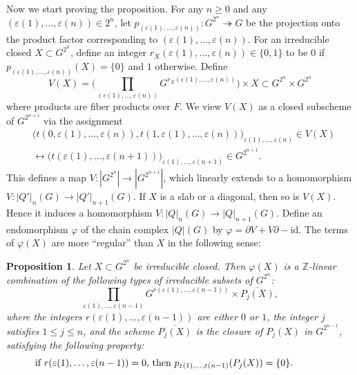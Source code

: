 \documentclass{amsart}
\newtheorem{Prop}[Thm]{Proposition}
\theoremstyle{remark}
\numberwithin{equation}{subsection}
\newcommand{\onto}{\twoheadrightarrow}
\newcommand{\closure}[1]{\overline{#1}}
\newcommand{\Z}{\mathbb{Z}}
\newcommand{\id}{\mathrm{id}}
\begin{document}
Now we start proving the proposition.
For any $n \ge 0$ and any $(\varepsilon(1), \dots, \varepsilon(n)) \in 2^{n}$,
let $p_{(\varepsilon(1), \dots, \varepsilon(n))} \colon G^{2^{n}} \onto G$
be the projection onto the product factor
corresponding to $(\varepsilon(1), \dots, \varepsilon(n))$.
For an irreducible closed $X \subset G^{2^{n}}$,
define an integer $r_{X}(\varepsilon(1), \dots, \varepsilon(n)) \in \{0, 1\}$ to be
$0$ if $p_{(\varepsilon(1), \dots, \varepsilon(n))}(X) = \{0\}$
and $1$ otherwise.
Define
	\begin{equation} \label{0479}
			V(X)
		=
				\biggl(
					\prod_{(\varepsilon(1), \dots, \varepsilon(n))}
						G^{r_{X}(\varepsilon(1), \dots, \varepsilon(n))}
				\biggr)
			\times
				X
		\subset
			G^{2^{n}} \times G^{2^{n}}
	\end{equation}
where products are fiber products over $F$.
We view $V(X)$ as a closed subscheme of $G^{2^{n + 1}}$ via the assignment
	\begin{align*}
		&
					\bigl(
						t(0, \varepsilon(1), \dots, \varepsilon(n)),
						t(1, \varepsilon(1), \dots, \varepsilon(n))
					\bigr)_{\varepsilon(1), \dots, \varepsilon(n)}
				\in
					V(X)
		\\
		&	\leftrightarrow
					\bigl(
						t(\varepsilon(1), \dots, \varepsilon(n + 1))
					\bigr)_{\varepsilon(1), \dots, \varepsilon(n + 1)}
				\in
					G^{2^{n + 1}}.
	\end{align*}
This defines a map $V \colon |G^{2^{n}}| \to |G^{2^{n + 1}}|$,
which linearly extends to a homomorphism
$V \colon |Q'|_{n}(G) \to |Q'|_{n + 1}(G)$.
If $X$ is a slab or a diagonal, then so is $V(X)$.
Hence it induces a homomorphism
$V \colon |Q|_{n}(G) \to |Q|_{n + 1}(G)$.
Define an endomorphism $\varphi$ of the chain complex $|Q|(G)$ by
$\varphi = \partial V + V \partial - \id$.
The terms of $\varphi(X)$ are more ``regular'' than $X$
in the following sense:

\begin{Prop} \label{0011}
	Let $X \subset G^{2^{n}}$ be irreducible closed.
	Then $\varphi(X)$ is a $\Z$-linear combination
	of the following types of irreducible subsets of $G^{2^{n}}$:
		\begin{equation} \label{0012}
				\prod_{\varepsilon(1), \dots, \varepsilon(n - 1)}
					G^{r(\varepsilon(1), \dots, \varepsilon(n - 1))}
			\times
				\closure{P_{j}(X)},
		\end{equation}
	where the integers $r(\varepsilon(1), \dots, \varepsilon(n - 1))$ are either $0$ or $1$,
	the integer $j$ satisfies $1 \le j \le n$,
	and the scheme $\closure{P_{j}(X)}$ is the closure of $P_{j}(X)$ in $G^{2^{n - 1}}$,
	satisfying the following property:
	\begin{equation} \label{0481}
		\begin{minipage}[c]{300pt}
			if $r(\varepsilon(1), \dots, \varepsilon(n - 1)) = 0$,
			then $p_{\varepsilon(1), \dots, \varepsilon(n - 1)}(P_{j}(X)) = \{0\}$.
		\end{minipage}
	\end{equation}
\end{Prop}
\end{document}
